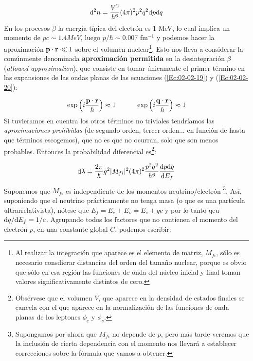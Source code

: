 \begin{eqnarray}
	\mathrm{d}^2 n = \frac{V^2}{h^6} (4\pi)^2 p^2 q^2 \mathrm{d} p \mathrm{d} q
\end{eqnarray}
En los procesos $\beta$ la energía típica del electrón es 1 MeV, lo cual implica un momento de $pc\sim1.4 MeV$, luego $p/\hbar \sim 0.007$ fm$^{-1}$ y podemos hacer la aproximación $\mathbf{p}\cdot\mathbf{r}\ll 1$ sobre el volumen nuclear\footnote{Al realizar la integración que aparece es el elemento de matriz, $M_{fi}$, sólo es necesario consdierar distancias del orden del tamaño nuclear, porque es obvio que sólo en esa región las funciones de onda del núcleo inicial y final toman valores significativamente distintos de cero.}. Esto nos lleva a considerar la comúnmente denominada \textbf{aproximación permitida} en la desintegración $\beta$ (\textit{allowed approximation}), que consiste en tomar únicamente el primer término en las expansiones de las ondas planas de las ecuaciones (\ref{Ec:02-02-19}) y (\ref{Ec:02-02-20}):

\begin{eqnarray}
	\exp \left( i \frac{\mathbf{p} \cdot \mathbf{r}}{\hbar} \right) \approx 1 \quad \quad \quad \exp \left( i \frac{\mathbf{q} \cdot \mathbf{r}}{\hbar} \right) \approx 1
\end{eqnarray} 
Si tuvieramos en cuentra los otros términos no triviales tendríamos las \textit{aproximaciones prohibidas} (de segundo orden, tercer orden... en función de hasta que términos escogemos), que no es que no ocurran, solo que son menos probables. Entonces la probabilidad diferencial es\footnote{Obsérvese que el volumen $V$, que aparece en la densidad de estados finales se cancela con el que aparece en la normalización de las funciones de onda planas de los leptones $\phi_e$ y $\phi_\nu$.}:

\begin{eqnarray}
	\mathrm{d} \lambda = \frac{2\pi}{\hbar} g^2 |M_{fi}|^2 (4\pi)^2 \frac{p^2 q^2}{h^ 6} \frac{\mathrm{d} p \mathrm{d} q }{\mathrm{d} E_f} \label{Ec:02-02-24}
\end{eqnarray}
Suponemos que $M_{fi}$ es independiente de los momentos neutrino/electrón \footnote{Supongamos por ahora que $M_{fi}$ no depende de $p$, pero más tarde veremos que la inclusión de cierta dependencia con el momento nos llevará a establecer correcciones sobre la fórmula que vamos a obtener.}. Así, suponiendo que el neutrino prácticamente no tenga masa (o que es una partícula ultrarrelativista), nótese que $E_f=E_e+E_\nu=E_e+qc$ y por lo tanto qeu $\mathrm{d} q / \mathrm{d} E_f=1/c$. Agrupando todos los factores que no contienen el momento del electrón $p$, en una constante global $C$, podemos escribir:

